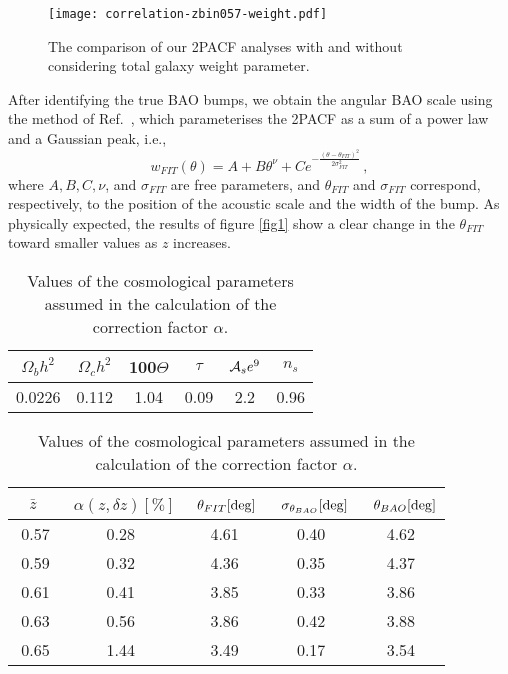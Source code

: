 \documentclass[a4paper,11pt]{article}
\begin{document}
\begin{figure} [h!]
\centering
\hspace{-0.8cm}\texttt{[image: correlation-zbin057-weight.pdf]}
\caption{The comparison of our 2PACF analyses with and without considering total galaxy weight parameter.}
\label{comparison}
\end{figure}

After identifying the true BAO bumps, we obtain the angular BAO scale using the method of Ref.~\cite{Sanchez11}, which {parameterises} the 2PACF as a sum of a power law and a Gaussian peak, i.e.,
\begin{equation} 
w_{FIT}(\theta) = A  + B \theta^\nu + C e^{-\frac{(\theta-\theta_{FIT})^2}{2 \sigma_{FIT}^2}} \, ,
\label{eq:fit}
\end{equation}
where $A,B,C,\nu$, and $\sigma_{FIT}$ are free parameters, and $\theta_{FIT}$ and $\sigma_{FIT}$ correspond, respectively, to the position of the acoustic scale  and the width of the bump. As physically expected, the results of figure \ref{fig1} show a clear change in the $\theta_{FIT}$ toward smaller values as $z$ increases.


\begin{table}
\centering
 \begin{tabular}{|c|c|c|c|c|c|}
\hline
$\Omega_bh^2$& $\Omega_ch^2$ &   100$\Theta$ & $\tau$ & ${\cal{A}}_se^9$ &  $n_s$\\
\hline
\hline
0.0226&  0.112& 1.04 & 0.09  & 2.2  & 0.96\\
\hline 
\end{tabular}
\caption{Values of the cosmological parameters assumed in the calculation of the correction factor $\alpha$.}
\label{table2}
\end{table}


\begin{table}
\centering
\begin{tabular}{ccccc}
\hline
$\bar{z}$&  \,\,\,$\alpha(z, \delta z) [\%]$ & \,\,$\theta_{FIT} [{\rm deg}]$  & 
\,\,\,$\sigma_{\theta_{BAO}}  [{\rm deg}]$ & \,\,\,$\theta_{BAO} [{\rm deg}]$  \\
\hline
\,\,0.57 &  0.28  & 4.61 & 0.40 & 4.62  \\
\,\,0.59 &  0.32  & 4.36 & 0.35 & 4.37  \\
\,\,0.61 &  0.41  & 3.85 & 0.33 & 3.86  \\
\,\,0.63 &  0.56  & 3.86 & 0.42 & 3.88  \\
\,\,0.65 &  1.44  & 3.49 & 0.17 & 3.54  \\
\hline
\end{tabular}
\caption{Values of the cosmological parameters assumed in the calculation of the correction factor $\alpha$.}
\label{table3}
\end{table}
\end{document}
